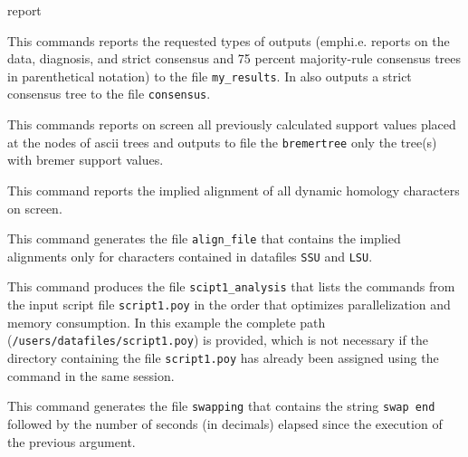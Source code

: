 \begin{command}{report}{}
\begin{poyexamples}
         {This commands reports the requested types of outputs (emph{i.e.}
        reports on the data, diagnosis, and strict consensus and 75 percent
         majority-rule consensus trees in parenthetical notation) to the file
         \texttt{my\_results}. In also outputs a strict consensus tree to the file
         \texttt{consensus}.}
         
         {This commands reports on screen all previously calculated support values
         placed at the nodes of ascii trees and outputs to file the \texttt{bremertree}
         only the tree(s) with bremer support values.}
         
         {This command reports the implied alignment of all dynamic homology
         characters on screen.}
         
          {This command generates the file \texttt{align\_file} that contains
          the implied alignments only for characters contained in datafiles
          \texttt{SSU} and \texttt{LSU}.}
          
          {This command produces the file \texttt{scipt1\_analysis} that lists the commands from
          the input script file \texttt{script1.poy} in the order that optimizes parallelization and
          memory consumption. In this example the complete path (\texttt{/users/datafiles/script1.poy})
          is provided, which is not necessary if the directory containing the file \texttt{script1.poy}
          has already been assigned using the command  in the same \poy session.}
          
          {This command generates the file \texttt{swapping} that contains
          the string \texttt{swap end} followed by the number of seconds (in
          decimals) elapsed since the execution of the previous 
          argument.}

	\end{poyexamples}

	\begin{poyalso}
	 \end{poyalso}

\end{command}

